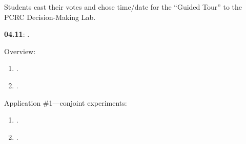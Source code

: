\documentclass[letterpaper]{article}
\renewenvironment{itemize}{
  \begin{list}{}{
    \setlength{\leftmargin}{1.5em}
  }
}{
  \end{list}
}
\begin{document}
\begin{enumerate}
\begin{itemize}
        \item[{\color{red}$\diamond$}] {\color{red} Students cast their votes \href{https://doodle.com/meeting/participate/id/dLn6RGAa}{{}} and chose time/date for the ``Guided Tour'' to the PCRC Decision-Making Lab}.


      \end{itemize}



	\item {\bf 04.11}: {\color{ForestGreen}{\bf Survey Experiments: Conjoint and List Designs}}.

			\begin{itemize} 

        \item[$\diamond$] Overview:

        \begin{enumerate}

          \item[$\bullet$] \href{https://www.cambridge.org/core/product/identifier/S1047198700006343/type/journal_article}{}.

          \item[$\bullet$] \href{https://www.cambridge.org/core/product/identifier/S2052263015000196/type/journal_article}{}.

        \end{enumerate}

       \item[$\diamond$] Application \#1---conjoint experiments:

           \begin{enumerate}


           \item[$\bullet$] \href{https://www.cambridge.org/core/product/identifier/S1047198700013589/type/journal_article}{}.


           \item[$\bullet$] \href{https://doi.org/10.1017/pan.2019.30}{}.


\end{enumerate}
\end{itemize}
\end{enumerate}
\end{document}

